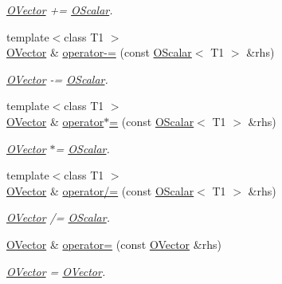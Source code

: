 \begin{DoxyCompactItemize}
\begin{DoxyCompactList}\small\item\em \mbox{\hyperlink{classENSEM_1_1OVector}{O\+Vector}} += \mbox{\hyperlink{classENSEM_1_1OScalar}{O\+Scalar}}. \end{DoxyCompactList}\item 
{\footnotesize template$<$class T1 $>$ }\\\mbox{\hyperlink{classENSEM_1_1OVector}{O\+Vector}} \& \mbox{\hyperlink{classENSEM_1_1OVector_ae2ae62360c5eb29827cb7e3d5556859f}{operator-\/=}} (const \mbox{\hyperlink{classENSEM_1_1OScalar}{O\+Scalar}}$<$ T1 $>$ \&rhs)
\begin{DoxyCompactList}\small\item\em \mbox{\hyperlink{classENSEM_1_1OVector}{O\+Vector}} -\/= \mbox{\hyperlink{classENSEM_1_1OScalar}{O\+Scalar}}. \end{DoxyCompactList}\item 
{\footnotesize template$<$class T1 $>$ }\\\mbox{\hyperlink{classENSEM_1_1OVector}{O\+Vector}} \& \mbox{\hyperlink{classENSEM_1_1OVector_a55710cffaf6c877d2465af80ad8b6c49}{operator$\ast$=}} (const \mbox{\hyperlink{classENSEM_1_1OScalar}{O\+Scalar}}$<$ T1 $>$ \&rhs)
\begin{DoxyCompactList}\small\item\em \mbox{\hyperlink{classENSEM_1_1OVector}{O\+Vector}} $\ast$= \mbox{\hyperlink{classENSEM_1_1OScalar}{O\+Scalar}}. \end{DoxyCompactList}\item 
{\footnotesize template$<$class T1 $>$ }\\\mbox{\hyperlink{classENSEM_1_1OVector}{O\+Vector}} \& \mbox{\hyperlink{classENSEM_1_1OVector_aa26be39a0620d0cdc1685bc2f1cc31a5}{operator/=}} (const \mbox{\hyperlink{classENSEM_1_1OScalar}{O\+Scalar}}$<$ T1 $>$ \&rhs)
\begin{DoxyCompactList}\small\item\em \mbox{\hyperlink{classENSEM_1_1OVector}{O\+Vector}} /= \mbox{\hyperlink{classENSEM_1_1OScalar}{O\+Scalar}}. \end{DoxyCompactList}\item 
\mbox{\hyperlink{classENSEM_1_1OVector}{O\+Vector}} \& \mbox{\hyperlink{classENSEM_1_1OVector_af1d768a4392ac2caf7d93faef7b39ed2}{operator=}} (const \mbox{\hyperlink{classENSEM_1_1OVector}{O\+Vector}} \&rhs)
\begin{DoxyCompactList}\small\item\em \mbox{\hyperlink{classENSEM_1_1OVector}{O\+Vector}} = \mbox{\hyperlink{classENSEM_1_1OVector}{O\+Vector}}. \end{DoxyCompactList}\item 

\end{DoxyCompactItemize}
